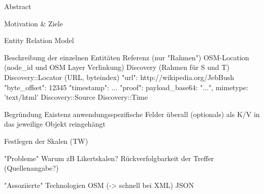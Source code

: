 Abstract

Motivation & Ziele

Entity Relation Model

  Beschreibung der einzelnen Entitäten
    Referenz (nur "Rahmen")
    OSM-Location (node_id und OSM Layer Verlinkung)
    Discovery (Rahmen für S und T)
    Discovery::Locator (URL, byteindex)
        "url": http://wikipedia.org/JebBush
        "byte_offset": 12345 %
        "timestamp": ...
        "proof": { payload_base64: "...", mimetype: 'text/html' }
    Discovery::Source
    Discovery::Time

    Begründung Existenz anwendungsspezifische Felder überall (optionals) als K/V in das jeweilige Objekt reingehängt

  Festlegen der Skalen (TW)

"Probleme"
   Warum zB Likertskalen? 
   Rückverfolgbarkeit der Treffer (Quellenangabe?)

"Assoziierte" Technologien 
  OSM (-> schnell bei XML) %
  JSON

